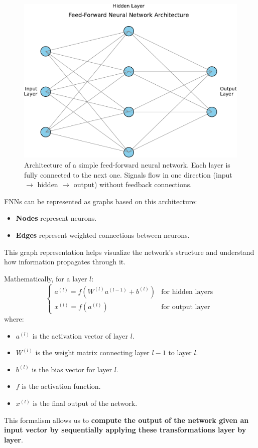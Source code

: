 \begin{figure}[!htp]
    \centering
    \includegraphics[width=.92\textwidth]{img/fnns/3-layer-fnn.pdf}
    \caption{Architecture of a simple feed-forward neural network. Each layer is fully connected to the next one. Signals flow in one direction (input $\to$ hidden $\to$ output) without feedback connections.}
\end{figure}

\noindent
FNNs can be represented as graphs based on this architecture:
\begin{itemize}
    \item \textbf{Nodes} represent neurons.
    \item \textbf{Edges} represent weighted connections between neurons.
\end{itemize}
This graph representation helps visualize the network's structure and understand how information propagates through it.

\highspace
Mathematically, for a layer $l$:
\begin{equation*}
    \begin{cases}
        a^{(l)} = f\left(W^{(l)} a^{(l-1)} + b^{(l)}\right) & \text{for hidden layers} \\
        x^{(l)} = f\left(a^{(l)}\right)                     & \text{for output layer}
    \end{cases}
\end{equation*}
where:
\begin{itemize}
    \item $a^{(l)}$ is the activation vector of layer $l$.
    \item $W^{(l)}$ is the weight matrix connecting layer $l-1$ to layer $l$.
    \item $b^{(l)}$ is the bias vector for layer $l$.
    \item $f$ is the activation function.
    \item $x^{(l)}$ is the final output of the network.
\end{itemize}
This formalism allows us to \textbf{compute the output of the network given an input vector by sequentially applying these transformations layer by layer}.

